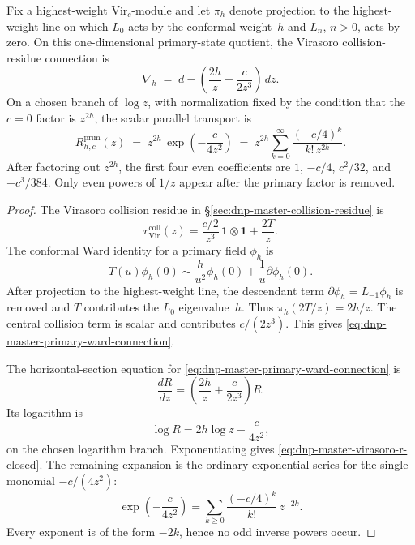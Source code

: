 \begin{computation}
\label{comp:dnp-master-virasoro-r-matrix}
Fix a highest-weight $\mathrm{Vir}_c$-module and let
$\pi_h$ denote projection to the highest-weight line on which
$L_0$ acts by the conformal weight~$h$ and $L_n$, $n>0$, acts by
zero.  On this one-dimensional primary-state quotient, the
Virasoro collision-residue connection is
\begin{equation}
\label{eq:dnp-master-primary-ward-connection}
\nabla_h
\;=\;
d-\left(\frac{2h}{z}+\frac{c}{2z^3}\right)\,dz .
\end{equation}
On a chosen branch of $\log z$, with normalization fixed by the
condition that the $c=0$ factor is $z^{2h}$, the scalar parallel
transport is
\begin{equation}
\label{eq:dnp-master-virasoro-r-closed}
R^{\mathrm{prim}}_{h,c}(z)
\;=\;
z^{2h}\,\exp\!\left(-\frac{c}{4z^2}\right)
\;=\;
z^{2h}\sum_{k=0}^{\infty}\frac{(-c/4)^k}{k!\,z^{2k}}.
\end{equation}
After factoring out $z^{2h}$, the first four even coefficients are
$1$, $-c/4$, $c^2/32$, and $-c^3/384$.
Only even powers of $1/z$ appear after the primary factor is removed.
\end{computation}

\begin{proof}
The Virasoro collision residue in
\S\ref{sec:dnp-master-collision-residue} is
\[
r_{\mathrm{Vir}}^{\mathrm{coll}}(z)
=\frac{c/2}{z^3}\,\mathbf 1\otimes\mathbf 1+\frac{2T}{z}.
\]
The conformal Ward identity for a primary field $\phi_h$ is
\[
T(u)\phi_h(0)
\sim
\frac{h}{u^2}\phi_h(0)+\frac{1}{u}\partial\phi_h(0).
\]
After projection to the highest-weight line, the descendant term
$\partial\phi_h=L_{-1}\phi_h$ is removed and $T$ contributes the
$L_0$ eigenvalue~$h$.  Thus $\pi_h(2T/z)=2h/z$.  The central
collision term is scalar and contributes $c/(2z^3)$.  This gives
\eqref{eq:dnp-master-primary-ward-connection}.

The horizontal-section equation for
\eqref{eq:dnp-master-primary-ward-connection} is
\[
\frac{dR}{dz}
=
\left(\frac{2h}{z}+\frac{c}{2z^3}\right)R .
\]
Its logarithm is
\[
\log R = 2h\log z-\frac{c}{4z^2},
\]
on the chosen logarithm branch.  Exponentiating gives
\eqref{eq:dnp-master-virasoro-r-closed}.  The remaining expansion is
the ordinary exponential series for the single monomial
$-c/(4z^2)$:
\[
\exp\!\left(-\frac{c}{4z^2}\right)
=
\sum_{k\ge0}\frac{(-c/4)^k}{k!}\,z^{-2k}.
\]
Every exponent is of the form $-2k$, hence no odd inverse powers occur.
\end{proof}

